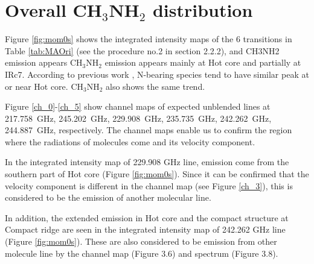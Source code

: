 \newpage
\section{Overall CH$_3$NH$_2$ distribution}
Figure \ref{fig:mom0s} shows the integrated intensity maps of the 6 transitions in Table \ref{tab:MAOri} (see the procedure no.2 in section 2.2.2), and CH3NH2 emission appears CH$_3$NH$_2$ emission appears mainly at Hot core and partially at IRc7.
According to previous work \citep[see e.g.,][]{Feng+2015, Gong+2015}, N-bearing species tend to have 
similar peak at or near Hot core.  CH$_3$NH$_2$ also shows the same trend.

Figure \ref{ch_0}-\ref{ch_5} show channel maps of expected unblended lines at 217.758~GHz, 
245.202~GHz, 229.908~GHz, 235.735~GHz, 242.262~GHz, 244.887~GHz, respectively.
The channel maps enable us to confirm the region where the radiations of molecules come and its velocity component.

In the integrated intensity map of 229.908 GHz line, emission come from the southern part of Hot core (Figure \ref{fig:mom0s}).
Since it can be confirmed that the velocity component is different in the channel map (see Figure \ref{ch_3}), 
this is considered to be the emission of another molecular line.

In addition, the extended emission in Hot core and the compact structure at Compact ridge are seen 
in the integrated intensity map of 242.262 GHz line (Figure \ref{fig:mom0s}). 
These are also considered to be emission from other molecule line 
by the channel map (Figure 3.6) and spectrum (Figure 3.8).

